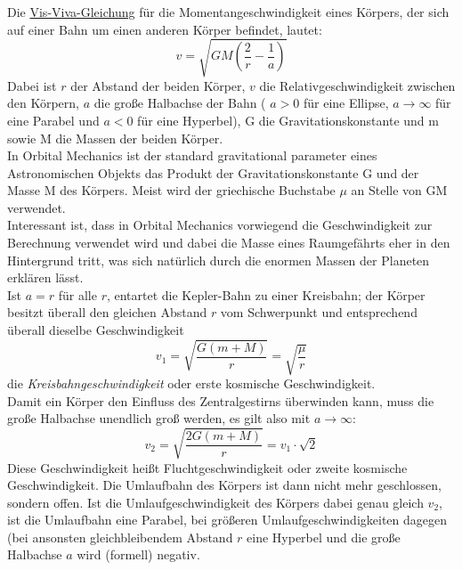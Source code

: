 \documentclass[12pt,paper=A4,numbers=noenddot,bibliography=totoc,listof=totoc,DIV=11,BCOR=1mm]{scrreprt}
\newcommand{\gq}[1]{\glqq #1\grqq} %
\begin{document}
\medskip
Die \href{https://de.wikipedia.org/wiki/Vis-Viva-Gleichung}{Vis-Viva-Gleichung} für die \hypertarget{velocityatorbitposition}{Momentangeschwindigkeit eines Körpers}, der sich auf einer Bahn um einen anderen Körper befindet, lautet:
\begin{equation}
v = \sqrt{GM \left( \frac{2}{r} - \frac{1}{a} \right) }
\end{equation}
Dabei ist $r$ der Abstand der beiden Körper, $v$ die Relativgeschwindigkeit zwischen den Körpern, $a$ die große Halbachse der Bahn ( $a > 0$ für eine Ellipse, $a \rightarrow \infty$ für eine Parabel und $a < 0$ für eine Hyperbel), G die Gravitationskonstante und m sowie M die Massen der beiden Körper. \\
In \gq{Orbital Mechanics} ist der \gq{standard gravitational parameter} eines \gq{Astronomischen Objekts} das Produkt der Gravitationskonstante G und der Masse M des Körpers.
Meist wird der griechische Buchstabe $\mu$ an Stelle von GM verwendet.\\
Interessant ist, dass in Orbital Mechanics vorwiegend die Geschwindigkeit zur Berechnung verwendet wird und dabei die Masse eines Raumgefährts eher in den Hintergrund tritt, was sich natürlich durch die enormen Massen der Planeten erklären lässt.\\
Ist $a = r$ für alle $r$, entartet die Kepler-Bahn zu einer Kreisbahn; der Körper besitzt überall den gleichen Abstand $r$ vom Schwerpunkt und entsprechend überall dieselbe Geschwindigkeit
\begin{equation}
v_{1} = \sqrt{\frac{G(m+M)}{r}} = \sqrt{\frac{\mu}{r}}
\end{equation}
die \textit{Kreisbahngeschwindigkeit} oder erste kosmische Geschwindigkeit.\\
Damit ein Körper den Einfluss des Zentralgestirns überwinden kann, muss die große Halbachse unendlich groß werden, es gilt also mit $a \rightarrow \infty$:
\begin{equation}
v_{2} = \sqrt{\frac{2G(m+M)}{r}} = v_{1}\cdot\sqrt{2}
\end{equation}
Diese Geschwindigkeit heißt Fluchtgeschwindigkeit oder zweite kosmische Geschwindigkeit. Die Umlaufbahn des Körpers ist dann nicht mehr geschlossen, sondern offen. Ist die Umlaufgeschwindigkeit des Körpers dabei genau gleich $v_{2}$, ist die Umlaufbahn eine Parabel, bei größeren Umlaufgeschwindigkeiten dagegen (bei ansonsten gleichbleibendem Abstand $r$ eine Hyperbel und die große Halbachse $a$ wird (formell) negativ.
\end{document}
